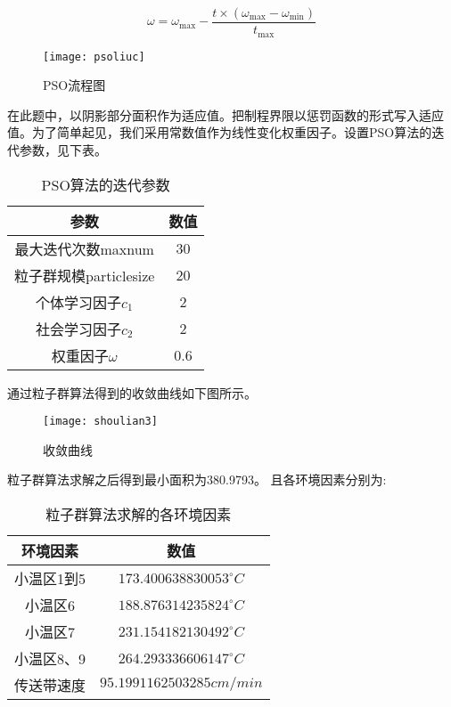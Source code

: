 \documentclass[withoutpreface,bwprint]{cumcmthesis} %
\begin{document}
\begin{equation}
\omega=\omega_{\max }-\frac{t \times\left(\omega_{\max }-\omega_{\min }\right)}{t_{\max }}
\end{equation}


\begin{figure}[!h]
	\centering
	\texttt{[image: psoliuc]}
	\caption{PSO流程图}
	\label{fig:psoliuc}
\end{figure}

在此题中，以阴影部分面积作为适应值。把制程界限以惩罚函数的形式写入适应值。为了简单起见，我们采用常数值作为线性变化权重因子。设置PSO算法的迭代参数，见下表。
\begin{table}[!htb]
	\centering
	\caption{PSO算法的迭代参数}
	\begin{tabular}{cc}
		\toprule[1.5pt]
		参数 & 数值\\
		\midrule[1pt]
		最大迭代次数maxnum & 30\\
		粒子群规模particlesize & 20\\
		个体学习因子$c_1$ & 2\\
		社会学习因子$c_2$ & 2\\
		权重因子$\omega$ & 0.6\\
		\bottomrule[1.5pt]
	\end{tabular}
\end{table}

通过粒子群算法得到的收敛曲线如下图所示。

\newpage
\begin{figure}[!h]
	\centering
	\texttt{[image: shoulian3]}
	\caption{收敛曲线}
	\label{fig:shoulian3}
\end{figure}

粒子群算法求解之后得到最小面积为380.9793。
且各环境因素分别为:
\begin{table}[!htb]
	\centering
	\caption{粒子群算法求解的各环境因素}
	\begin{tabular}{cc}
		\toprule[1.5pt]
		环境因素 & 数值\\
		\midrule[1pt]
		小温区1到5 & $173.400638830053^{\circ}C$\\
		小温区6 & $188.876314235824^{\circ}C$\\
		小温区7 & $231.154182130492^{\circ}C$\\
		小温区8、9 & $ 264.293336606147^{\circ}C$\\
		传送带速度 & $95.1991162503285cm/min$\\
		\bottomrule[1.5pt]
	\end{tabular}
\end{table}
\end{document}
